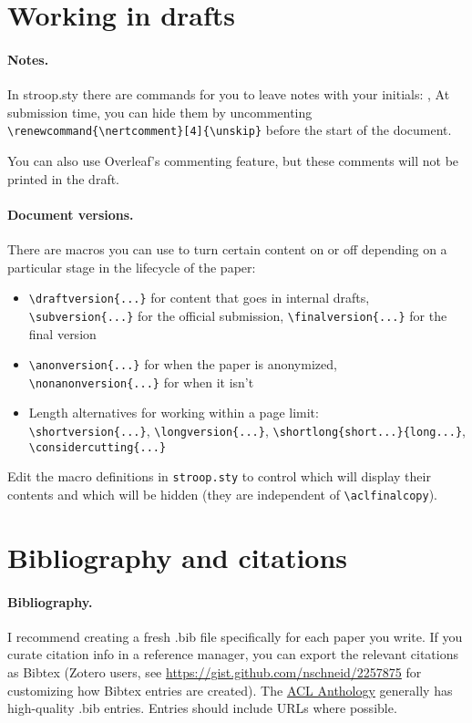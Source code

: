 \section{Working in drafts}

\paragraph{Notes.}
In stroop.sty there are commands for you to leave notes with your initials:
,
At submission time, you can hide them by uncommenting
\verb|\renewcommand{\nertcomment}[4]{\unskip}| before the start of the document.

You can also use Overleaf's commenting feature, but these comments will not be printed in the draft.

\paragraph{Document versions.}
There are macros you can use to turn certain content on or off
depending on a particular stage in the lifecycle of the paper:
\begin{itemize}
    \item \verb|\draftversion{...}| for content that goes in internal drafts, \verb|\subversion{...}| for the official submission, \verb|\finalversion{...}| for the final version
    \item \verb|\anonversion{...}| for when the paper is anonymized,
    \verb|\nonanonversion{...}| for when it isn't
    \item Length alternatives for working within a page limit:\\ \verb|\shortversion{...}|, \verb|\longversion{...}|, \verb|\shortlong{short...}{long...}|, \verb|\considercutting{...}|
\end{itemize}
Edit the macro definitions in \verb|stroop.sty| to control which will display
their contents and which will be hidden
(they are independent of \verb|\aclfinalcopy|).

\section{Bibliography and citations}\label{sec:bib}

\paragraph{Bibliography.}
I recommend creating a fresh .bib file specifically for each paper you write.
If you curate citation info in a reference manager, you can export the relevant
citations as Bibtex
(Zotero users, see \url{https://gist.github.com/nschneid/2257875} for customizing
how Bibtex entries are created).
The \href{https://www.aclweb.org/anthology/}{ACL Anthology} generally has high-quality .bib entries.
Entries should include URLs where possible.

